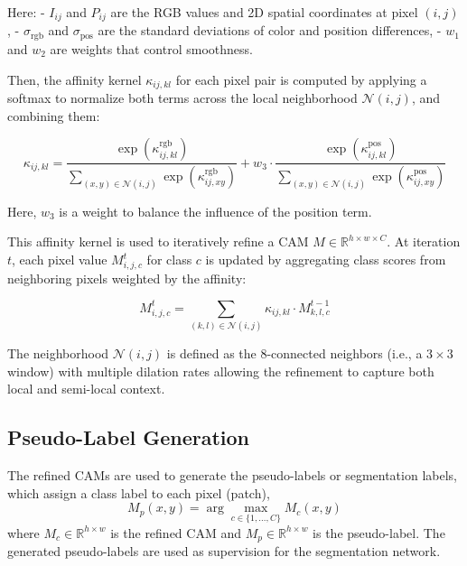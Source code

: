 Here:
- \( I_{ij} \) and \( P_{ij} \) are the RGB values and 2D spatial coordinates at pixel \((i, j)\),
- \( \sigma_{\text{rgb}} \) and \( \sigma_{\text{pos}} \) are the standard deviations of color and position differences,
- \( w_1 \) and \( w_2 \) are weights that control smoothness.

Then, the affinity kernel \( \kappa_{ij,kl} \) for each pixel pair is computed by applying a softmax to normalize both terms across the local neighborhood \( \mathcal{N}(i, j) \), and combining them:

\[
    \kappa_{ij,kl} = \frac{ \exp(\kappa^{\text{rgb}}_{ij,kl}) }{ \sum\limits_{(x, y) \in \mathcal{N}(i, j)} \exp(\kappa^{\text{rgb}}_{ij,xy}) }
    + w_3 \cdot \frac{ \exp(\kappa^{\text{pos}}_{ij,kl}) }{ \sum\limits_{(x, y) \in \mathcal{N}(i, j)} \exp(\kappa^{\text{pos}}_{ij,xy}) }
\]

Here, \( w_3 \) is a weight to balance the influence of the position term.

This affinity kernel is used to iteratively refine a CAM \( M \in \mathbb{R}^{h \times w \times C} \). At iteration \( t \), each pixel value \( M^t_{i,j,c} \) for class \( c \) is updated by aggregating class scores from neighboring pixels weighted by the affinity:

\begin{equation}
    M^t_{i,j,c} = \sum_{(k, l) \in \mathcal{N}(i, j)} \kappa_{ij,kl} \cdot M^{t-1}_{k,l,c}
\end{equation}


The neighborhood \( \mathcal{N}(i, j) \) is defined as the 8-connected neighbors (i.e., a \(3\times{3}\) window) with multiple dilation rates  allowing the refinement to capture both local and semi-local context.

\subsection{Pseudo-Label Generation}
\label{subsec:pseudo_label_generation}
The refined CAMs are used to generate the pseudo-labels or segmentation labels, which assign a class label to each pixel (patch),
\begin{equation}
    M_p(x, y) = \arg\max_{c \in \{1, \ldots, C\}} M_c(x, y)
\end{equation}
where \( M_c \in \mathbb{R}^{h \times w} \) is the refined CAM and \( M_p \in \mathbb{R}^{h \times w} \) is the pseudo-label.
The generated pseudo-labels are used as supervision for the segmentation network.



